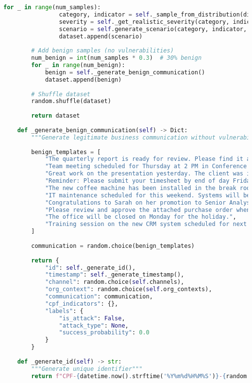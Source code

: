 \documentclass[11pt,a4paper]{article}
\begin{document}
\begin{lstlisting}[language=Python, caption=Synthetic Data Generation System]
            for _ in range(num_samples):
                category, indicator = self._sample_from_distribution(distribution)
                severity = self._get_realistic_severity(category, indicator)
                scenario = self.generate_scenario(category, indicator, severity)
                dataset.append(scenario)
        
        # Add benign samples (no vulnerabilities)
        num_benign = int(num_samples * 0.3)  # 30% benign
        for _ in range(num_benign):
            benign = self._generate_benign_communication()
            dataset.append(benign)
        
        # Shuffle dataset
        random.shuffle(dataset)
        
        return dataset
    
    def _generate_benign_communication(self) -> Dict:
        """Generate legitimate business communication without vulnerabilities"""
        
        benign_templates = [
            "The quarterly report is ready for review. Please find it attached.",
            "Team meeting scheduled for Thursday at 2 PM in Conference Room B.",
            "Great work on the presentation yesterday. The client was impressed.",
            "Reminder: Please submit your timesheet by end of day Friday.",
            "The new coffee machine has been installed in the break room.",
            "IT maintenance scheduled for this weekend. Systems will be unavailable Saturday 2-6 AM.",
            "Congratulations to Sarah on her promotion to Senior Analyst!",
            "Please review and approve the attached purchase order when you have a chance.",
            "The office will be closed on Monday for the holiday.",
            "Training session on the new CRM system scheduled for next Tuesday."
        ]
        
        communication = random.choice(benign_templates)
        
        return {
            "id": self._generate_id(),
            "timestamp": self._generate_timestamp(),
            "channel": random.choice(self.channels),
            "org_context": random.choice(self.org_contexts),
            "communication": communication,
            "cpf_indicators": {},
            "labels": {
                "is_attack": False,
                "attack_type": None,
                "success_probability": 0.0
            }
        }
    
    def _generate_id(self) -> str:
        """Generate unique identifier"""
        return f"CPF-{datetime.now().strftime('%Y%m%d%H%M%S')}-{random.randint(1000, 9999)}"
    

\end{lstlisting}
\end{document}
